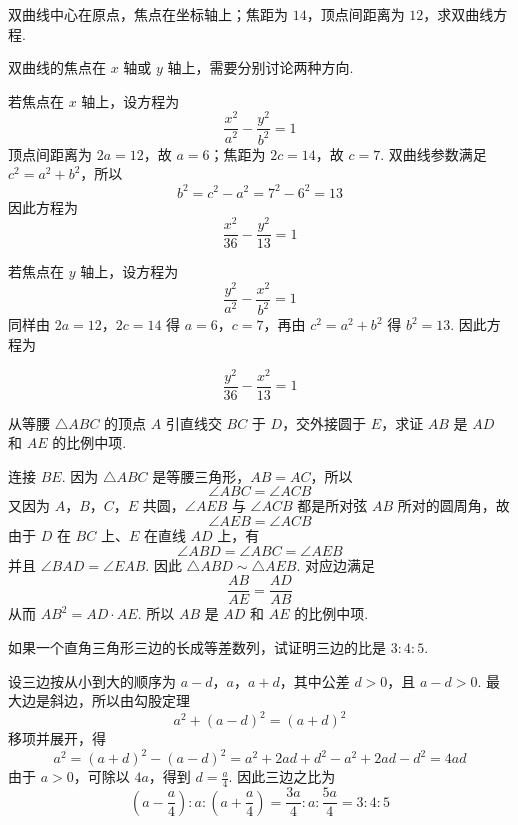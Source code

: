 \begin{problem}
双曲线中心在原点，焦点在坐标轴上；焦距为 \(14\)，顶点间距离为 \(12\)，求双曲线方程.
\end{problem}

\begin{solution}
双曲线的焦点在 \(x\) 轴或 \(y\) 轴上，需要分别讨论两种方向.

若焦点在 \(x\) 轴上，设方程为
\[
\frac{x^2}{a^2}-\frac{y^2}{b^2}=1
\]
顶点间距离为 \(2a=12\)，故 \(a=6\)；焦距为 \(2c=14\)，故 \(c=7\). 双曲线参数满足 \(c^2=a^2+b^2\)，所以
\[
b^2=c^2-a^2=7^2-6^2=13
\]
因此方程为
\[
\frac{x^2}{36}-\frac{y^2}{13}=1
\]


若焦点在 \(y\) 轴上，设方程为
\[
\frac{y^2}{a^2}-\frac{x^2}{b^2}=1
\]
同样由 \(2a=12\)，\(2c=14\) 得 \(a=6\)，\(c=7\)，再由 \(c^2=a^2+b^2\) 得 \(b^2=13\). 因此方程为


\[
\frac{y^2}{36}-\frac{x^2}{13}=1
\]
\end{solution}

\begin{problem}
从等腰 \(\triangle ABC\) 的顶点 \(A\) 引直线交 \(BC\) 于 \(D\)，交外接圆于 \(E\)，求证 \(AB\) 是 \(AD\) 和 \(AE\) 的比例中项.

\end{problem}

\begin{solution}
连接 \(BE\). 因为 \(\triangle ABC\) 是等腰三角形，\(AB=AC\)，所以
\[
\angle ABC=\angle ACB
\]
又因为 \(A\)，\(B\)，\(C\)，\(E\) 共圆，\(\angle AEB\) 与 \(\angle ACB\) 都是所对弦 \(AB\) 所对的圆周角，故
\[
\angle AEB=\angle ACB
\]
由于 \(D\) 在 \(BC\) 上、\(E\) 在直线 \(AD\) 上，有
\[
\angle ABD=\angle ABC=\angle AEB
\]
并且 \(\angle BAD=\angle EAB\).
因此 \(\triangle ABD\sim\triangle AEB\). 对应边满足
\[
\frac{AB}{AE}=\frac{AD}{AB}
\]
从而 \(AB^2=AD\cdot AE\). 所以 \(AB\) 是 \(AD\) 和 \(AE\) 的比例中项.
\end{solution}

\begin{problem}
如果一个直角三角形三边的长成等差数列，试证明三边的比是 \(3:4:5\).
\end{problem}

\begin{solution}
设三边按从小到大的顺序为 \(a-d\)，\(a\)，\(a+d\)，其中公差 \(d>0\)，且 \(a-d>0\). 最大边是斜边，所以由勾股定理
\[
a^2+\left(a-d\right)^2=\left(a+d\right)^2
\]
移项并展开，得
\[
a^2=\left(a+d\right)^2-\left(a-d\right)^2
=a^2+2ad+d^2-a^2+2ad-d^2=4ad
\]
由于 \(a>0\)，可除以 \(4a\)，得到 \(d=\frac{a}{4}\). 因此三边之比为
\[
\left(a-\frac{a}{4}\right):a:\left(a+\frac{a}{4}\right)
=\frac{3a}{4}:a:\frac{5a}{4}=3:4:5
\]

\end{solution}

